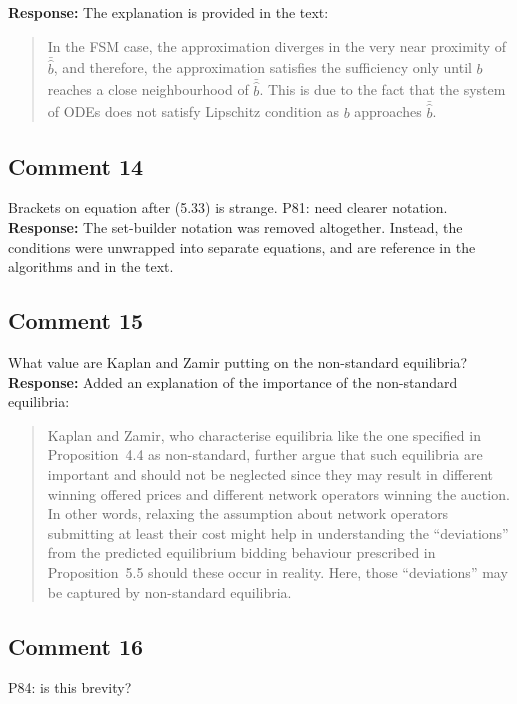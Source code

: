 \documentclass[10pt,a4paper,notitlepage]{article}
\numberwithin{equation}{section}
\begin{document}
\textbf{Response:}
The explanation is provided in the text:
\begin{quote}
In the FSM case, the approximation diverges in the very near proximity of $\bar{\hat{b}}$, and therefore, the approximation satisfies the sufficiency only until $b$ reaches a close neighbourhood of $\bar{\hat{b}}$. This is due to the fact that the system of ODEs does not satisfy Lipschitz condition as $b$ approaches $\bar{\hat{b}}$.
\end{quote}

\subsection{Comment 14}
Brackets on equation after (5.33) is strange. P81: need clearer notation.\\[-2ex]

\textbf{Response:}
The set-builder notation was removed altogether. Instead, the conditions were unwrapped into separate equations, and are reference in the algorithms and in the text.

\subsection{Comment 15}
What value are Kaplan and Zamir putting on the non-standard equilibria?\\[-2ex]

\textbf{Response:}
Added an explanation of the importance of the non-standard equilibria:
\begin{quote}
Kaplan and Zamir, who characterise equilibria like the one specified in Proposition~4.4 as non-standard, further argue that such equilibria are important and should not be neglected since they may result in different winning offered prices and different network operators winning the auction. In other words, relaxing the assumption about network operators submitting at least their cost might help in understanding the ``deviations'' from the predicted equilibrium bidding behaviour prescribed in Proposition~5.5 should these occur in reality. Here, those ``deviations'' may be captured by non-standard equilibria.
\end{quote}

\subsection{Comment 16}
P84: is this brevity?\\[-2ex]
\end{document}
